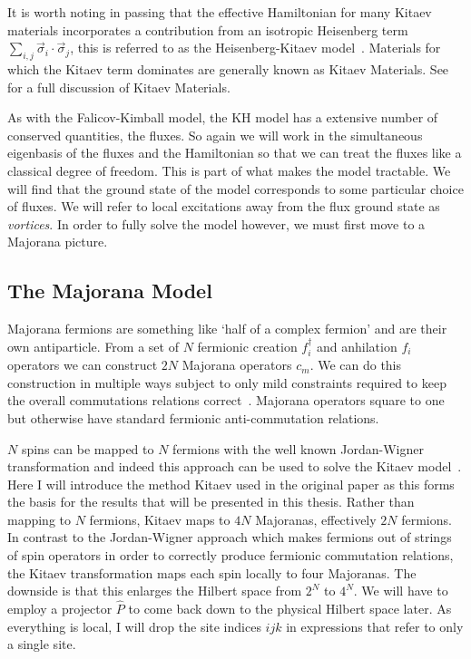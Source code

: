 It is worth noting in passing that the effective Hamiltonian for many Kitaev materials incorporates a contribution from an isotropic Heisenberg term \(\sum_{i,j} \vec{\sigma}_i\cdot\vec{\sigma}_j\), this is referred to as the Heisenberg-Kitaev model~\autocite{Chaloupka2010}. Materials for which the Kitaev term dominates are generally known as Kitaev Materials. See~\autocite{TrebstPhysRep2022} for a full discussion of Kitaev Materials.

As with the Falicov-Kimball model, the KH model has a extensive number of conserved quantities, the fluxes. So again we will work in the simultaneous eigenbasis of the fluxes and the Hamiltonian so that we can treat the fluxes like a classical degree of freedom. This is part of what makes the model tractable. We will find that the ground state of the model corresponds to some particular choice of fluxes. We will refer to local excitations away from the flux ground state as \emph{vortices}. In order to fully solve the model however, we must first move to a Majorana picture.

\hypertarget{the-majorana-model}{%
\subsection{The Majorana Model}\label{the-majorana-model}}

Majorana fermions are something like `half of a complex fermion' and are their own antiparticle. From a set of \(N\) fermionic creation \(f_i^\dagger\) and anhilation \(f_i\) operators we can construct \(2N\) Majorana operators \(c_m\). We can do this construction in multiple ways subject to only mild constraints required to keep the overall commutations relations correct~\autocite{kitaevAnyonsExactlySolved2006}. Majorana operators square to one but otherwise have standard fermionic anti-commutation relations.

\(N\) spins can be mapped to \(N\) fermions with the well known Jordan-Wigner transformation and indeed this approach can be used to solve the Kitaev model~\autocite{chenExactResultsKitaev2008}. Here I will introduce the method Kitaev used in the original paper as this forms the basis for the results that will be presented in this thesis. Rather than mapping to \(N\) fermions, Kitaev maps to \(4N\) Majoranas, effectively \(2N\) fermions. In contrast to the Jordan-Wigner approach which makes fermions out of strings of spin operators in order to correctly produce fermionic commutation relations, the Kitaev transformation maps each spin locally to four Majoranas. The downside is that this enlarges the Hilbert space from \(2^N\) to \(4^N\). We will have to employ a projector \(\hat{P}\) to come back down to the physical Hilbert space later. As everything is local, I will drop the site indices \(ijk\) in expressions that refer to only a single site.

